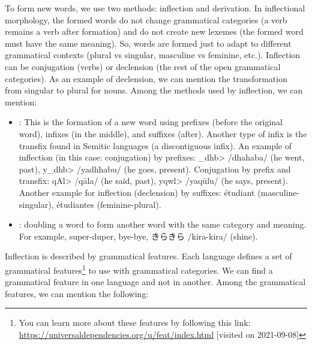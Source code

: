 \documentclass{KBook}
\begin{document}
To form new words, we use two methods: inflection and derivation. In inflectional morphology, the formed words do not change grammatical categories (a verb remains a verb after formation) and do not create new lexemes (the formed word must have the same meaning). So, words are formed just to adapt to different grammatical contexts (plural vs singular, masculine vs feminine, etc.). Inflection can be conjugation (verbs) or declension (the rest of the open grammatical categories). As an example of declension, we can mention the transformation from singular to plural for nouns. Among the methods used by inflection, we can mention:
\begin{itemize}
	\item {}: This is the formation of a new word using prefixes (before the original word), infixes (in the middle), and suffixes (after). Another type of infix is the transfix found in Semitic languages (a discontiguous infix). An example of inflection (in this case: conjugation) by prefixes: \<_dhb> /dhahaba/ (he went, past), \<y_dhb> /yadhhabu/ (he goes, present). Conjugation by prefix and transfix: \<qAl> /qāla/ (he said, past), \<yqwl> /yaqūlu/ (he says, present). Another example for inflection (declension) by suffixes: étudiant (masculine-singular), étudiantes (feminine-plural).
	\item {}: doubling a word to form another word with the same category and meaning. For example, super-duper, bye-bye, きらきら /kira-kira/ (shine).
\end{itemize}
Inflection is described by grammatical features. Each language defines a set of grammatical features\footnote{You can learn more about these features by following this link: \url{https://universaldependencies.org/u/feat/index.html} [visited on 2021-09-08]} to use with grammatical categories. We can find a grammatical feature in one language and not in another. Among the grammatical features, we can mention the following:
\end{document}
